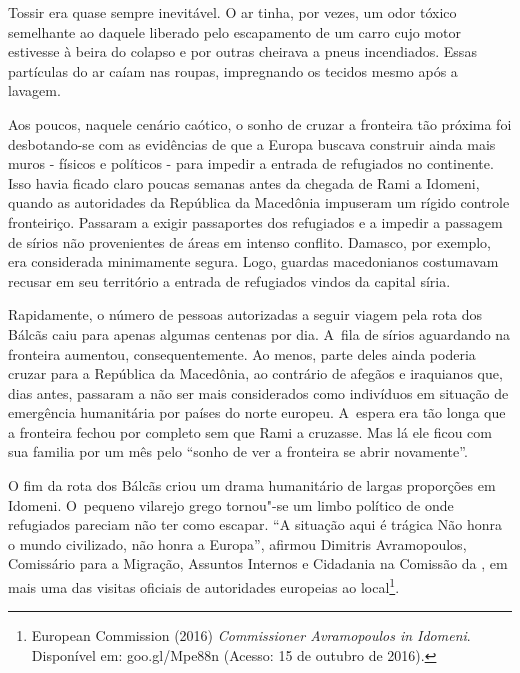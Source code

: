 Tossir era quase sempre inevitável. O ar tinha, por vezes, um odor tóxico semelhante ao daquele liberado
pelo escapamento de um carro cujo motor estivesse à beira do colapso e por outras cheirava a pneus incendiados. 
Essas partículas do ar caíam nas roupas, impregnando os tecidos mesmo após a lavagem.
% 
% 
% 
%
%

% 
% 
Aos poucos, naquele cenário caótico, o  sonho de cruzar a fronteira tão
próxima foi desbotando-se com as evidências de que a Europa buscava
construir ainda mais muros - físicos e políticos - para impedir a entrada
de refugiados no continente. Isso havia ficado claro poucas semanas
antes da chegada de Rami a Idomeni, quando as autoridades da República
da Macedônia impuseram um rígido controle fronteiriço. Passaram a exigir
passaportes dos refugiados e a impedir a passagem de sírios não
provenientes de áreas em intenso conflito. Damasco, por exemplo, era
considerada minimamente segura. Logo, guardas macedonianos costumavam
recusar em seu território a entrada de refugiados vindos da capital
síria.

Rapidamente, o número de pessoas autorizadas a seguir viagem pela rota
dos Bálcãs caiu para apenas algumas centenas por dia. A~fila de sírios
aguardando na fronteira aumentou, consequentemente. Ao menos, parte
deles ainda poderia cruzar para a República da Macedônia, ao contrário
de afegãos e iraquianos que, dias antes, passaram a não ser mais
considerados como indivíduos em situação de emergência humanitária por
países do norte europeu. A~espera era tão longa que a fronteira fechou
por completo sem que Rami a cruzasse. Mas lá ele ficou com sua familia
por um mês pelo ``sonho de ver a fronteira se abrir novamente''.

O fim da rota dos Bálcãs criou um drama humanitário de largas proporções
em Idomeni. O~pequeno vilarejo grego tornou"-se um limbo político de onde
refugiados pareciam não ter como escapar. ``A situação aqui é trágica
\redondo{[…]} Não honra o mundo civilizado, não honra a Europa'',
afirmou Dimitris Avramopoulos, Comissário para a Migração, Assuntos
Internos e Cidadania na Comissão da , em mais uma das visitas oficiais
de autoridades europeias ao local\footnote{ European Commission (2016) \emph{Commissioner
Avramopoulos in Idomeni}. Disponível em:
goo.gl/Mpe88n (Acesso: 15
de outubro de 2016).}.

